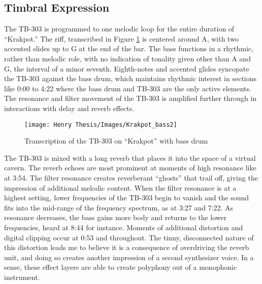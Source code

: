 \documentclass[12pt,twoside]{reedthesis}
\begin{document}
\subsection{Timbral Expression}

 The TB-303 is programmed to one melodic loop for the entire duration of ``Krakpot.'' The riff, transcribed in Figure \ref{fig:krakpotbass} is centered around A, with two accented slides up to G at the end of the bar. The bass functions in a rhythmic, rather than melodic role, with no indication of tonality given other than A and G, the interval of a minor seventh. Eighth-notes and accented glides syncopate the TB-303 against the bass drum, which maintains rhythmic interest in sections like 0:00 to 4:22 where the bass drum and TB-303 are the only active elements. The resonance and filter movement of the TB-303 is amplified further through in interactions with delay and reverb effects.


\begin{figure}[htbp]
\begin{centering}
\texttt{[image: Henry Thesis/Images/Krakpot\_bass2]}
\caption{Transcription of the TB-303 on ``Krakpot'' with bass drum}
\label{fig:krakpotbass}
\end{centering} 
\end{figure}

The TB-303 is mixed with a long reverb that places it into the space of a virtual cavern. The reverb echoes are most prominent at moments of high resonance like at 3:54. The filter resonance creates reverberant ``ghosts'' that trail off, giving the impression of additional melodic content. When the filter resonance is at a highest setting, lower frequencies of the TB-303 begin to vanish and the sound fits into the mid-range of the frequency spectrum, as at 3:27 and 7:22. As resonance decreases, the bass gains more body and returns to the lower frequencies, heard at 8:44 for instance. Moments of additional distortion and digital clipping occur at 0:53 and throughout. The tinny, disconnected nature of this distortion leads me to believe it is a consequence of overdriving the reverb unit, and doing so creates another impression of a second synthesizer voice. In a sense, these effect layers are able to create polyphony out of a monophonic instrument.
\end{document}
